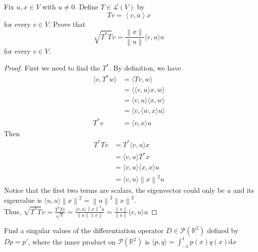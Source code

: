 \begin{exercise}
	Fix $u, x \in V$ with $u \neq 0$. Define $T \in \mathcal{L}(V)$ by \[
		Tv = \left< v, u \right> x
	\]
	for every $v \in V$. Prove that \[
		\sqrt{T^* T}v = \frac{\left\| x \right\|}{\left\| u \right\|} \langle v , u \rangle u
	\] for every $v \in V$.
\end{exercise}
\begin{proof}
  First we need to find the $T^*$. By definition, we have
	\begin{equation*}
		\begin{aligned}
			\langle v , T^*w \rangle &= \langle Tv , w \rangle \\
			&= \langle \langle v , u \rangle x , w \rangle \\
			&= \langle v , u \rangle \langle x , w \rangle \\
			&= \langle v , \langle w , x \rangle u \rangle \\
      T^* v &= \langle v , x \rangle u
		\end{aligned}
	\end{equation*}
	Then \begin{equation*}
		\begin{aligned}
		 T^*T v &= T^* \langle v , u \rangle x \\
		 &= \langle v , u \rangle T^* x \\
		 &= \langle v , u \rangle \langle x , x \rangle u \\
		 &= \langle v , u \rangle \left\| x \right\|^{2} u
		\end{aligned}
	\end{equation*}
	Notice that the first two terms are scalars,
	the eigenvector could only be $u$ and its eigenvalue
	is $\langle u , u \rangle \left\| x \right\|^{2} = \left\| u \right\|^{2} \left\| x \right\|^{2}$. \\
  Thus, $\sqrt{T^*T}v = \frac{T^*T v}{\sqrt{\lambda}} = \frac{\langle v , u \rangle\left\| x \right\|^{2} u}{\left\| u \right\|\left\| x \right\|}
	= \frac{\left\| x \right\|}{\left\| u \right\|}\langle v , u \rangle u $
\end{proof}

\begin{exercise}
  Find a singular values of the differentiation operator 
  $D \in \mathcal{P}(\mathbb{R}^2)$ defined by $Dp = p'$, where the inner product on
  $\mathcal{P}(\mathbb{R}^2)$ is $\langle p, q \rangle = \int_{-1}^{1} p(x)q(x) \mathrm{d} x$
\end{exercise}

